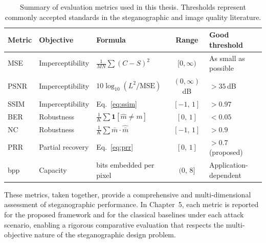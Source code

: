 \documentclass[12pt,a4paper,oneside]{report}
\begin{document}
	\begin{table}[htbp]
		\centering
		\caption{Summary of evaluation metrics used in this thesis. Thresholds represent
			commonly accepted standards in the steganographic and image quality literature.}
		\label{tab:metrics_summary}
		\renewcommand{\arraystretch}{1.35}
		\small
		\begin{tabular}{@{} l l l c l @{}}
			\toprule
			\textbf{Metric} & \textbf{Objective} & \textbf{Formula} & \textbf{Range}
			& \textbf{Good threshold} \\
			\midrule
			MSE  & Imperceptibility & $\frac{1}{MN}\sum(C-S)^2$ & $[0, \infty)$ & As small as possible \\
			PSNR & Imperceptibility & $10\log_{10}(L^2/\mathrm{MSE})$ & $(0, \infty)$ dB & $> 35$\,dB \\
			SSIM & Imperceptibility & Eq.~\eqref{eq:ssim} & $[-1,\,1]$ & $> 0.97$ \\
			\midrule
			BER  & Robustness & $\frac{1}{K}\sum \mathbf{1}[\hat{m}\neq m]$ & $[0,\,1]$ & $< 0.05$ \\
			NC   & Robustness & $\frac{1}{K}\sum \bar{m}\cdot\hat{\bar{m}}$ & $[-1,\,1]$ & $> 0.9$ \\
			PRR  & Partial recovery & Eq.~\eqref{eq:prr} & $[0,\,1]$ & $> 0.7$ (proposed) \\
			\midrule
			bpp  & Capacity & bits embedded per pixel & $(0,\,8]$ & Application-dependent \\
			\bottomrule
		\end{tabular}
	\end{table}
	
	These metrics, taken together, provide a comprehensive and multi-dimensional assessment of
	steganographic performance. In Chapter~5, each metric is reported for the proposed framework
	and for the classical baselines under each attack scenario, enabling a rigorous comparative
	evaluation that respects the multi-objective nature of the steganographic design problem.
	
\end{document}
